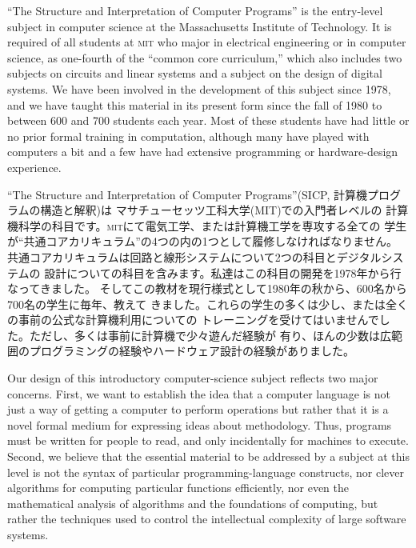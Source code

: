 \documentclass[oneside]{book}
\newcommand{\acronym}[1]{\textsc{\MakeLowercase{#1}}}
\begin{document}
\vspace{0.8em}

\noindent
``The Structure and Interpretation of Computer Programs'' is the entry-level
subject in computer science at the Massachusetts Institute of Technology.  It
is required of all students at \acronym{MIT} who major in electrical
engineering or in computer science, as one-fourth of the ``common core
curriculum,'' which also includes two subjects on circuits and linear systems
and a subject on the design of digital systems.  We have been involved in the
development of this subject since 1978, and we have taught this material in its
present form since the fall of 1980 to between 600 and 700 students each year.
Most of these students have had little or no prior formal training in
computation, although many have played with computers a bit and a few have had
extensive programming or hardware-design experience.

``The Structure and Interpretation of Computer Programs''(SICP, 計算機プログラムの構造と解釈)は
マサチューセッツ工科大学(MIT)での入門者レベルの
計算機科学の科目です。\acronym{MIT}にて電気工学、または計算機工学を専攻する全ての
学生が``共通コアカリキュラム''の4つの内の1つとして履修しなければなりません。
共通コアカリキュラムは回路と線形システムについて2つの科目とデジタルシステムの
設計についての科目を含みます。私達はこの科目の開発を1978年から行なってきました。
そしてこの教材を現行様式として1980年の秋から、600名から700名の学生に毎年、教えて
きました。これらの学生の多くは少し、または全くの事前の公式な計算機利用についての
トレーニングを受けてはいませんでした。ただし、多くは事前に計算機で少々遊んだ経験が
有り、ほんの少数は広範囲のプログラミングの経験やハードウェア設計の経験がありました。

Our design of this introductory computer-science subject reflects two major
concerns.  First, we want to establish the idea that a computer language is not
just a way of getting a computer to perform operations but rather that it is a
novel formal medium for expressing ideas about methodology.  Thus, programs
must be written for people to read, and only incidentally for machines to
execute.  Second, we believe that the essential material to be addressed by a
subject at this level is not the syntax of particular programming-language
constructs, nor clever algorithms for computing particular functions
efficiently, nor even the mathematical analysis of algorithms and the
foundations of computing, but rather the techniques used to control the
intellectual complexity of large software systems.
\end{document}

